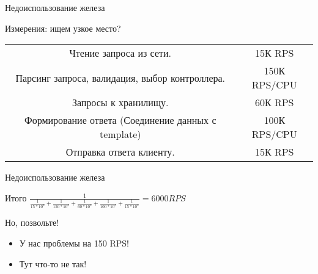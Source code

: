 \documentclass[aspectratio=169]{beamer}
\begin{document}
\begin{frame}{Недоиспользование железа}
    \begin{block}{Измерения: ищем узкое место?}
        \begin{tabular}{ c c }

            \pause Чтение запроса из сети. & 15К RPS  \\
            \pause Парсинг запроса, валидация, выбор контроллера. & 150К RPS/CPU  \\
            \pause Запросы к хранилищу. & 60К RPS \\
            \pause Формирование ответа (Соединение данных с template) & 100К RPS/CPU \\
            \pause Отправка ответа клиенту. & 15К RPS \\

        \end{tabular}
    \end{block}
\end{frame}
    

\begin{frame}{Недоиспользование железа}
    \begin{block}{Итого}
        {\huge
            $\frac{1}{\frac{1}{15 * 10^3} + \frac{1}{150 * 10^3} + \frac{1}{60 * 10^3}+\frac{1}{100 * 10^3}+\frac{1}{15 * 10^3}} = 6000 RPS$
        }
    \end{block}

    \pause
    \begin{block}{Но, позвольте!}
        \begin{itemize}
            \pause\item У нас проблемы на 150 RPS!
            \pause\item Тут что-то не так!
        \end{itemize}
    \end{block}
\end{frame}
\end{document}
